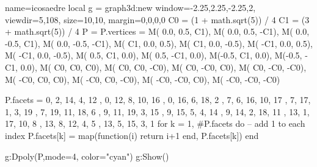 \documentclass{standalone}
\begin{document}
    \begin{luadraw}{name=icosaedre}
    local g = graph3d:new{ 
        window={-2.25,2.25,-2.25,2},
        viewdir={5,108}, 
        size={10,10}, 
        margin={0,0,0,0}
    }
C0 = (1 + math.sqrt(5)) / 4
C1 = (3 + math.sqrt(5)) / 4
P = {}
P.vertices = {
  M( 0.0,  0.5,   C1),
  M( 0.0,  0.5,  -C1),
  M( 0.0, -0.5,   C1),
  M( 0.0, -0.5,  -C1),
  M(  C1,  0.0,  0.5),
  M(  C1,  0.0, -0.5),
  M( -C1,  0.0,  0.5),
  M( -C1,  0.0, -0.5),
  M( 0.5,   C1,  0.0),
  M( 0.5,  -C1,  0.0),
 M(-0.5,   C1,  0.0),
 M(-0.5,  -C1,  0.0),
 M(  C0,   C0,   C0),
 M(  C0,   C0,  -C0),
 M(  C0,  -C0,   C0),
 M(  C0,  -C0,  -C0),
 M( -C0,   C0,   C0),
 M( -C0,   C0,  -C0),
 M( -C0,  -C0,   C0),
 M( -C0,  -C0,  -C0) }

P.facets ={
{  0,  2, 14,  4, 12 },
{  0, 12,  8, 10, 16 },
{  0, 16,  6, 18,  2 },
{  7,  6, 16, 10, 17 },
{  7, 17,  1,  3, 19 },
{  7, 19, 11, 18,  6 },
{  9, 11, 19,  3, 15 },
{  9, 15,  5,  4, 14 },
{  9, 14,  2, 18, 11 },
{ 13,  1, 17, 10,  8 },
{ 13,  8, 12,  4,  5 },
{ 13,  5, 15,  3,  1 } }
for k = 1, #P.facets do  -- add 1 to each index
    P.facets[k] = map(function(i) return i+1  end, P.facets[k])
end

g:Dpoly(P,{mode=4, color="cyan"})
g:Show() 
    \end{luadraw}
\end{document}
